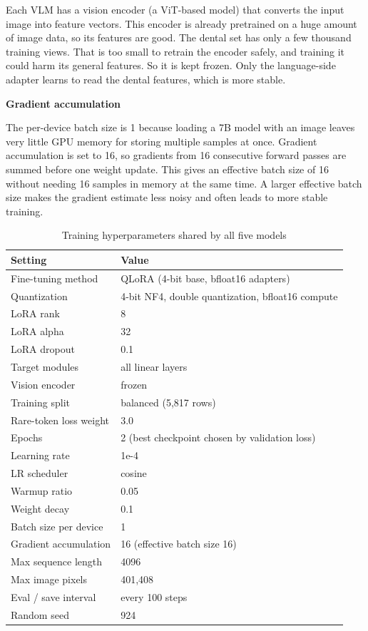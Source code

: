 \documentclass[a4paper,12pt]{report}
\newcommand{\minisection}[1]{%
  \vspace{1ex}
  \noindent\textbf{#1}\par
  \vspace{0.5ex}
}
\begin{document}
Each VLM has a vision encoder (a ViT-based model) that converts the input image into feature vectors. This encoder is already pretrained on a huge amount of image data, so its features are good. The dental set has only a few thousand training views. That is too small to retrain the encoder safely, and training it could harm its general features. So it is kept frozen. Only the language-side adapter learns to read the dental features, which is more stable.

\minisection{Gradient accumulation}

The per-device batch size is 1 because loading a 7B model with an image leaves very little GPU memory for storing multiple samples at once. Gradient accumulation is set to 16, so gradients from 16 consecutive forward passes are summed before one weight update. This gives an effective batch size of 16 without needing 16 samples in memory at the same time. A larger effective batch size makes the gradient estimate less noisy and often leads to more stable training.

\begin{table}[H]
\centering
\caption{Training hyperparameters shared by all five models}
\begin{tabular}{ll}
\toprule
Setting & Value \\
\midrule
Fine-tuning method      & QLoRA (4-bit base, bfloat16 adapters) \\
Quantization            & 4-bit NF4, double quantization, bfloat16 compute \\
LoRA rank               & 8 \\
LoRA alpha              & 32 \\
LoRA dropout            & 0.1 \\
Target modules          & all linear layers \\
Vision encoder          & frozen \\
Training split          & balanced (5{,}817 rows) \\
Rare-token loss weight  & 3.0 \\
Epochs                  & 2 (best checkpoint chosen by validation loss) \\
Learning rate           & 1e-4 \\
LR scheduler            & cosine \\
Warmup ratio            & 0.05 \\
Weight decay            & 0.1 \\
Batch size per device   & 1 \\
Gradient accumulation   & 16 (effective batch size 16) \\
Max sequence length     & 4096 \\
Max image pixels        & 401{,}408 \\
Eval / save interval    & every 100 steps \\
Random seed             & 924 \\
\bottomrule
\end{tabular}
\end{table}
\end{document}
